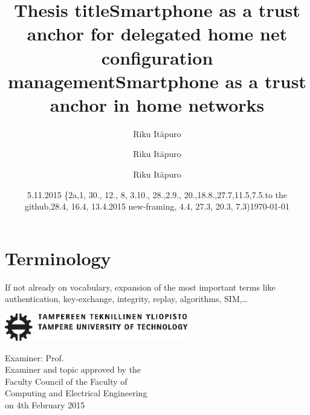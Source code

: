 \documentclass[12pt,a4paper,english]{tutthesis}
\author{Riku Itäpuro}
\title{Thesis title}      %
\author{Riku Itäpuro}
\title{Smartphone as a trust anchor for delegated home net configuration management}
\author{Riku Itäpuro}
\date{5.11.2015 \{2a,1, 30., 12., 8, 3.10., 28.,2.9., 20.,18.8.,27.7,11.5,7.5.to the github,28.4, 16.4, 13.4.2015 new-framing, 4.4, 27.3,  20.3, 7.3)}
\title{Smartphone as a trust anchor in home networks}
\begin{document}
\maketitle



\chapter*{Terminology}
\markboth{}{}                                %

If not already on vocabulary, expansion of the most important terms like
authentication, key-exchange, integrity, replay, algorithms, SIM,\ldots{}

\newpage             %

 \pagestyle{headings}
 \thispagestyle{empty}
\date\today
 \vspace*{-.5cm}\noindent
 \includegraphics[width=8cm]{tty_tut_logo}   %

\vspace{6.8cm}
\maketitle
\vspace{6.7cm} %

\begin{flushright}  
  \begin{minipage}[c]{6.8cm}
    \begin{spacing}{1.0}
      \textsf{Examiner: Prof. \@examiner}\\
      \textsf{Examiner and topic approved by the}\\ 
      \textsf{Faculty Council of the Faculty of} \\
      \textsf{Computing and Electrical Engineering} \\
      \textsf{on 4th February 2015}\\
    \end{spacing}
  \end{minipage}
\end{flushright}
\end{document}
